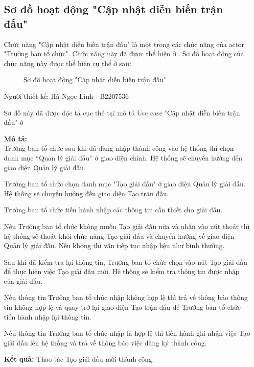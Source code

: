 \subsection{Sơ đồ hoạt động "Cập nhật diễn biến trận đấu"}
\setcounter{figure}{0}

Chức năng "Cập nhật diễn biến trận đấu" là một trong các chức năng của actor "Trưởng ban tổ chức".
Chức năng này đã được thể hiện ở .
Sơ đồ hoạt động của chức năng này được thể hiện cụ thể ở  sau:

\begin{figure}[H]
  \centering
  
  \caption{Sơ đồ hoạt động "Cập nhật diễn biến trận đấu"}
  \label{fig:at-2}
\end{figure}

Người thiết kế: Hà Ngọc Linh - B2207536

Sơ đồ này đã được đặc tả cục thể tại mô tả Use case "Cập nhật diễn biến trận đấu"
ở 

\noindent
\textbf{Mô tả:}\\
Trưởng ban tổ chức sau khi đã đăng nhập thành công vào hệ thống thì chọn danh mục “Quản lý giải đấu” ở giao diện chính. Hệ thống sẽ chuyển hướng đến giao diện Quản lý giải đấu.\par
Trưởng ban tổ chức chọn danh mục "Tạo giải đấu" ở giao diện Quản lý giải đấu. Hệ thống sẽ chuyển hướng đến giao diện Tạo trận đấu.\par
Trưởng ban tổ chức tiến hành nhập các thông tin cần thiết cho giải đấu.\par
Nếu Trưởng ban tổ chức không muốn Tạo giải đấu nữa và nhấn vào nút thoát thì hệ thống sẽ thoát khỏi chức năng Tạo giải đấu và chuyển hướng về giao diện Quản lý giải đấu. Nếu không thì vẫn tiếp tục nhập liệu như bình thường.\par
Sau khi đã kiểm tra lại thông tin, Trưởng ban tổ chức chọn vào nút Tạo giải đấu để thực hiện việc Tạo giải đấu mới. Hệ thống sẽ kiểm tra thông tin được nhập của giải đấu.\par
Nếu thông tin Trưởng ban tổ chức nhập không hợp lệ thì trả về thông báo thông tin không hợp lệ và quay trở lại giao diện Tạo trận đấu để Trưởng ban tổ chức tiến hành nhập lại thông tin.\par
Nếu thông tin Trưởng ban tổ chức nhập là hợp lệ thì tiến hành ghi nhận việc Tạo giải đấu lên hệ thống và trả về thông báo việc đăng ký thành công.

\noindent
\textbf{Kết quả:} Thao tác Tạo giải đấu mới thành công.


